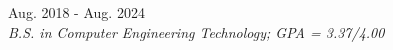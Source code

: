 
	\hfill Aug. 2018 - Aug. 2024\\
\textit{B.S. in Computer Engineering Technology; GPA = 3.37/4.00}

